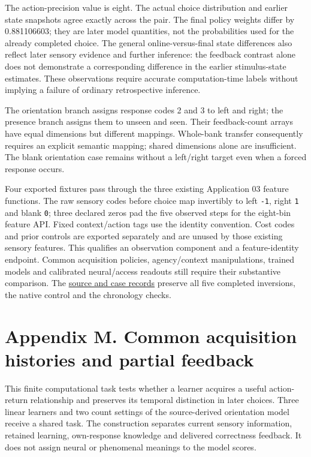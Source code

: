 \documentclass[
  american,
  11pt,
  letterpaper,
]{article}
\begin{document}
The action-precision value is eight. The actual choice distribution and earlier state snapshots agree exactly across the pair. The final policy weights differ by 0.881106603; they are later model quantities, not the probabilities used for the already completed choice. The general online-versus-final state differences also reflect later sensory evidence and further inference: the feedback contrast alone does not demonstrate a corresponding difference in the earlier stimulus-state estimates. These observations require accurate computation-time labels without implying a failure of ordinary retrospective inference.

The orientation branch assigns response codes 2 and 3 to left and right; the presence branch assigns them to unseen and seen. Their feedback-count arrays have equal dimensions but different mappings. Whole-bank transfer consequently requires an explicit semantic mapping; shared dimensions alone are insufficient. The blank orientation case remains without a left/right target even when a forced response occurs.

Four exported fixtures pass through the three existing Application 03 feature functions. The raw sensory codes before choice map invertibly to left \texttt{-1}, right \texttt{1} and blank \texttt{0}; three declared zeros pad the five observed steps for the eight-bin feature API. Fixed context/action tags use the identity convention. Cost codes and prior controls are exported separately and are unused by those existing sensory features. This qualifies an observation component and a feature-identity endpoint. Common acquisition policies, agency/context manipulations, trained models and calibrated neural/access readouts still require their substantive comparison. The \href{https://github.com/v5ma/v5ma.github.io/blob/master/papers/companions/learning-to-feel-v1.0/ARTIFACT-AVAILABILITY.md#artifact-41}{source and case records} preserve all five completed inversions, the native control and the chronology checks.

\clearpage
\begingroup\setlength{\parskip}{2pt plus 1pt minus 1pt}
\hypertarget{appendix-m}{}

\section{Appendix M. Common acquisition histories and partial feedback}\label{appendix-m.-common-acquisition-histories-and-partial-feedback}

This finite computational task tests whether a learner acquires a useful action-return relationship and preserves its temporal distinction in later choices. Three linear learners and two count settings of the source-derived orientation model receive a shared task. The construction separates current sensory information, retained learning, own-response knowledge and delivered correctness feedback. It does not assign neural or phenomenal meanings to the model scores.
\end{document}
